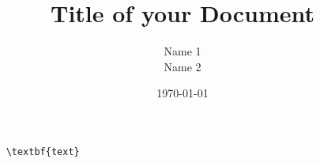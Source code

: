 \documentclass[12pt]{article}
\title{Title of your Document}
\author{Name 1 \\ Name 2}
\date{\today}
\begin{document}
	\maketitle 
	
	\begin{verbatim}
	\textbf{text} 
	
	\end{verbatim}
	
\end{document}
